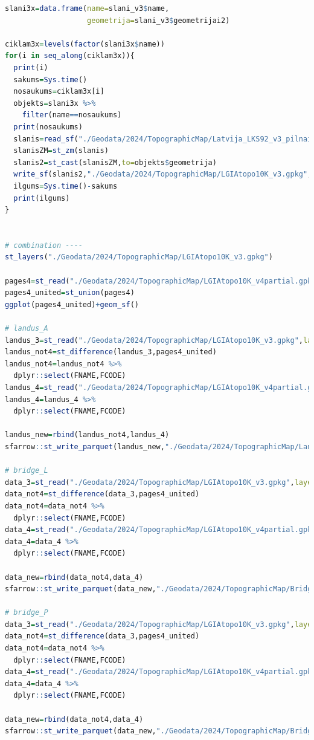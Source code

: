 \documentclass[
]{book}
\begin{document}
\begin{lstlisting}[language=R]
slani3x=data.frame(name=slani_v3$name,
                   geometrija=slani_v3$geometrijai2)

ciklam3x=levels(factor(slani3x$name))
for(i in seq_along(ciklam3x)){
  print(i)
  sakums=Sys.time()
  nosaukums=ciklam3x[i]
  objekts=slani3x %>% 
    filter(name==nosaukums)
  print(nosaukums)
  slanis=read_sf("./Geodata/2024/TopographicMap/Latvija_LKS92_v3_pilnais.gdb/",layer=nosaukums)
  slanisZM=st_zm(slanis)
  slanis2=st_cast(slanisZM,to=objekts$geometrija)
  write_sf(slanis2,"./Geodata/2024/TopographicMap/LGIAtopo10K_v3.gpkg",layer=nosaukums,append=FALSE)
  ilgums=Sys.time()-sakums
  print(ilgums)
}


# combination ----
st_layers("./Geodata/2024/TopographicMap/LGIAtopo10K_v3.gpkg")

pages4=st_read("./Geodata/2024/TopographicMap/LGIAtopo10K_v4partial.gpkg",layer="Topo10_lapas")
pages4_united=st_union(pages4)
ggplot(pages4_united)+geom_sf()

# landus_A
landus_3=st_read("./Geodata/2024/TopographicMap/LGIAtopo10K_v3.gpkg",layer="landus_A")
landus_not4=st_difference(landus_3,pages4_united)
landus_not4=landus_not4 %>% 
  dplyr::select(FNAME,FCODE)
landus_4=st_read("./Geodata/2024/TopographicMap/LGIAtopo10K_v4partial.gpkg",layer="landus_A")
landus_4=landus_4 %>% 
  dplyr::select(FNAME,FCODE)

landus_new=rbind(landus_not4,landus_4)
sfarrow::st_write_parquet(landus_new,"./Geodata/2024/TopographicMap/LandusA_COMB.parquet")

# bridge_L
data_3=st_read("./Geodata/2024/TopographicMap/LGIAtopo10K_v3.gpkg",layer="bridge_L")
data_not4=st_difference(data_3,pages4_united)
data_not4=data_not4 %>% 
  dplyr::select(FNAME,FCODE)
data_4=st_read("./Geodata/2024/TopographicMap/LGIAtopo10K_v4partial.gpkg",layer="bridge_L")
data_4=data_4 %>% 
  dplyr::select(FNAME,FCODE)

data_new=rbind(data_not4,data_4)
sfarrow::st_write_parquet(data_new,"./Geodata/2024/TopographicMap/BridgeL_COMB.parquet")

# bridge_P
data_3=st_read("./Geodata/2024/TopographicMap/LGIAtopo10K_v3.gpkg",layer="bridge_P")
data_not4=st_difference(data_3,pages4_united)
data_not4=data_not4 %>% 
  dplyr::select(FNAME,FCODE)
data_4=st_read("./Geodata/2024/TopographicMap/LGIAtopo10K_v4partial.gpkg",layer="bridge_P")
data_4=data_4 %>% 
  dplyr::select(FNAME,FCODE)

data_new=rbind(data_not4,data_4)
sfarrow::st_write_parquet(data_new,"./Geodata/2024/TopographicMap/BridgeP_COMB.parquet")


\end{lstlisting}
\end{document}

